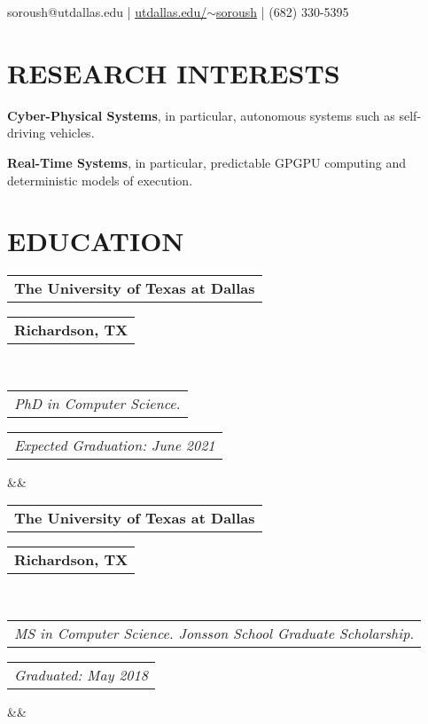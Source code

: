 \documentclass[10pt,letterpaper,sans]{moderncv}        %
\makeatletter
\newcommand*{\customcventry}[7][.25em]{
  \begin{tabular}{@{}l} 
    {\bfseries #4}
  \end{tabular}
  \hfill%
  \begin{tabular}{l@{}}
     {\bfseries #5}
  \end{tabular} \\
  \begin{tabular}{@{}l} 
    {\itshape #3}
  \end{tabular}
  \hfill%
  \begin{tabular}{l@{}}
     {\itshape #2}
  \end{tabular}
  \ifx&#7&%
  \else{\\%
    \begin{minipage}{\maincolumnwidth}%
      \small#7%
    \end{minipage}}\fi%
  \par\addvspace{#1}}
\makeatother
\begin{document}

\makecvtitle
\vspace*{-12mm}
%
\begin{flushleft}
\faEnvelopeO\hspace{0.00em} soroush@utdallas.edu | \hspace{0.25em}\faGlobe\hspace{0.00em} \href{https://www.utdallas.edu/~soroush/}{utdallas.edu/$\sim$soroush}  | \hspace{0.25em}\faMobile\hspace{0.00em} (682) 330-5395
\end{flushleft}

\vspace{1mm}

\section{RESEARCH INTERESTS}
\textbf{Cyber-Physical Systems}, in particular, autonomous systems such as self-driving vehicles.

\textbf{Real-Time Systems}, in particular, predictable GPGPU computing and deterministic models of execution.



\section{EDUCATION}
{\customcventry{Expected Graduation: June 2021}{PhD in Computer Science.}{The University of Texas at Dallas}{Richardson, TX}{}{}}
{\customcventry{Graduated: May 2018}{MS in Computer Science. Jonsson School Graduate Scholarship.}{The University of Texas at Dallas}{Richardson, TX}{}{}}
\end{document}
